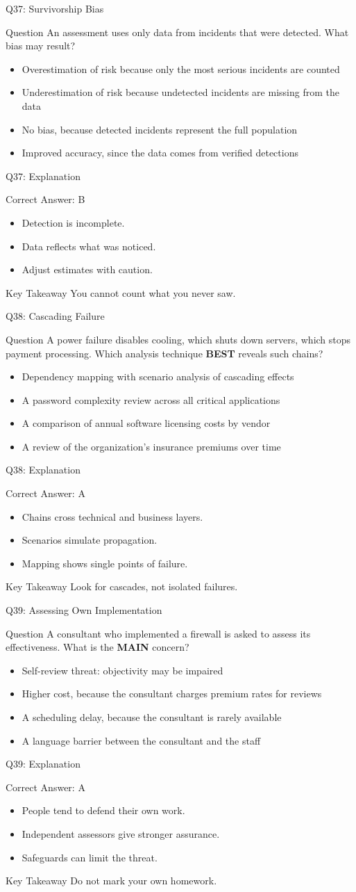 \documentclass[aspectratio=169]{beamer}
\newcommand{\hq}[7]{%
	\begin{frame}{Q#1: #2}
		\begin{block}{Question}
			#3
		\end{block}
		\begin{itemize}
			#4
		\end{itemize}
	\end{frame}
	\begin{frame}{Q#1: Explanation}
		\begin{block}{Correct Answer: #5}
			\begin{itemize}
				#6
			\end{itemize}
		\end{block}
		\begin{alertblock}{Key Takeaway}
			#7
		\end{alertblock}
	\end{frame}
}
\begin{document}
	\hq{37}{Survivorship Bias}
	{An assessment uses only data from incidents that were detected. What bias may result?}
	{\item[\textbf{(A)}] Overestimation of risk because only the most serious incidents are counted
		\item[\textbf{(B)}] Underestimation of risk because undetected incidents are missing from the data
		\item[\textbf{(C)}] No bias, because detected incidents represent the full population
		\item[\textbf{(D)}] Improved accuracy, since the data comes from verified detections}
	{B}
	{\item Detection is incomplete.
		\item Data reflects what was noticed.
		\item Adjust estimates with caution.}
	{You cannot count what you never saw.}

	\hq{38}{Cascading Failure}
	{A power failure disables cooling, which shuts down servers, which stops payment processing. Which analysis technique \textbf{BEST} reveals such chains?}
	{\item[\textbf{(A)}] Dependency mapping with scenario analysis of cascading effects
		\item[\textbf{(B)}] A password complexity review across all critical applications
		\item[\textbf{(C)}] A comparison of annual software licensing costs by vendor
		\item[\textbf{(D)}] A review of the organization's insurance premiums over time}
	{A}
	{\item Chains cross technical and business layers.
		\item Scenarios simulate propagation.
		\item Mapping shows single points of failure.}
	{Look for cascades, not isolated failures.}

	\hq{39}{Assessing Own Implementation}
	{A consultant who implemented a firewall is asked to assess its effectiveness. What is the \textbf{MAIN} concern?}
	{\item[\textbf{(A)}] Self-review threat: objectivity may be impaired
		\item[\textbf{(B)}] Higher cost, because the consultant charges premium rates for reviews
		\item[\textbf{(C)}] A scheduling delay, because the consultant is rarely available
		\item[\textbf{(D)}] A language barrier between the consultant and the staff}
	{A}
	{\item People tend to defend their own work.
		\item Independent assessors give stronger assurance.
		\item Safeguards can limit the threat.}
	{Do not mark your own homework.}
\end{document}
